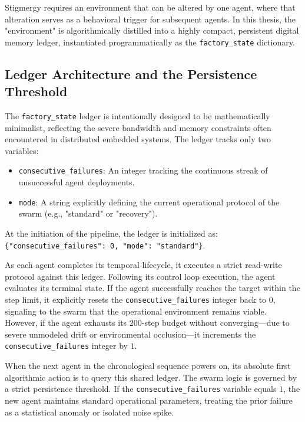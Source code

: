 \documentclass[12pt,a4paper,oneside]{report}
\begin{document}
Stigmergy requires an environment that can be altered by one agent, where that alteration serves as a behavioral trigger for subsequent agents. In this thesis, the "environment" is algorithmically distilled into a highly compact, persistent digital memory ledger, instantiated programmatically as the \texttt{factory\_state} dictionary.

\subsection{Ledger Architecture and the Persistence Threshold}

The \texttt{factory\_state} ledger is intentionally designed to be mathematically minimalist, reflecting the severe bandwidth and memory constraints often encountered in distributed embedded systems. The ledger tracks only two variables:

\begin{itemize}
    \item \texttt{consecutive\_failures}: An integer tracking the continuous streak of unsuccessful agent deployments.
    \item \texttt{mode}: A string explicitly defining the current operational protocol of the swarm (e.g., "standard" or "recovery").
\end{itemize}

At the initiation of the pipeline, the ledger is initialized as: \texttt{\{"consecutive\_failures": 0, "mode": "standard"\}}. 

As each agent completes its temporal lifecycle, it executes a strict read-write protocol against this ledger. Following its control loop execution, the agent evaluates its terminal state. If the agent successfully reaches the target within the step limit, it explicitly resets the \texttt{consecutive\_failures} integer back to $0$, signaling to the swarm that the operational environment remains viable. However, if the agent exhausts its 200-step budget without converging—due to severe unmodeled drift or environmental occlusion—it increments the \texttt{consecutive\_failures} integer by $1$.

When the next agent in the chronological sequence powers on, its absolute first algorithmic action is to query this shared ledger. The swarm logic is governed by a strict persistence threshold. If the \texttt{consecutive\_failures} variable equals $1$, the new agent maintains standard operational parameters, treating the prior failure as a statistical anomaly or isolated noise spike. 
\end{document}
